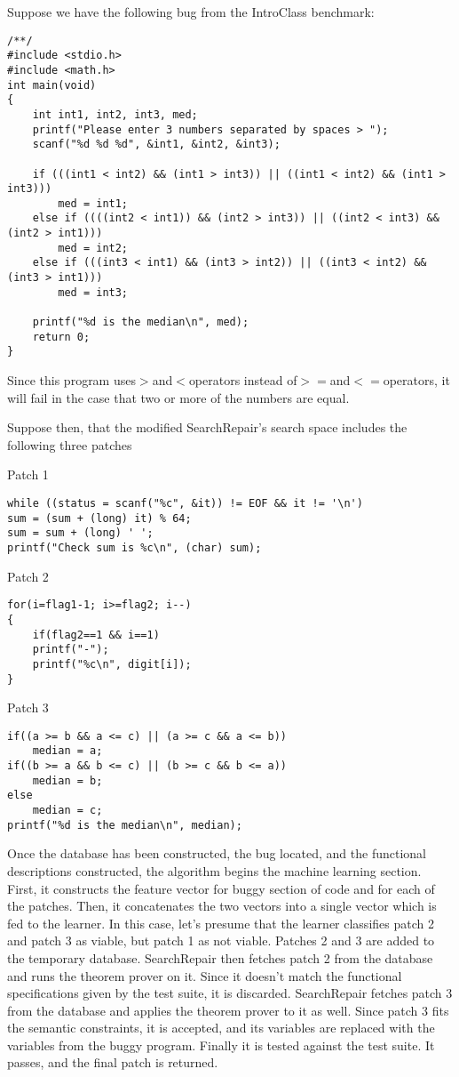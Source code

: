 \documentclass{paper}
\begin{document}
Suppose we have the following bug from the IntroClass benchmark: 

\begin{lstlisting}
/**/
#include <stdio.h>
#include <math.h>
int main(void)
{
	int int1, int2, int3, med; 
	printf("Please enter 3 numbers separated by spaces > ");
	scanf("%d %d %d", &int1, &int2, &int3);

	if (((int1 < int2) && (int1 > int3)) || ((int1 < int2) && (int1 > int3)))
	 	med = int1;
	else if ((((int2 < int1)) && (int2 > int3)) || ((int2 < int3) && (int2 > int1)))
        med = int2;
	else if (((int3 < int1) && (int3 > int2)) || ((int3 < int2) && (int3 > int1)))
	    med = int3;
    
    printf("%d is the median\n", med);
	return 0;
}                                             
\end{lstlisting}

Since this program uses$ > $and$ < $operators instead of$ >= $and$ <= $operators, it will fail in the case that two or more of the numbers are equal. 

Suppose then, that the modified SearchRepair's search space includes the following three patches

Patch 1
\begin{lstlisting}
while ((status = scanf("%c", &it)) != EOF && it != '\n') 
sum = (sum + (long) it) % 64;
sum = sum + (long) ' ';
printf("Check sum is %c\n", (char) sum);                                             
\end{lstlisting}

Patch 2
\begin{lstlisting}
for(i=flag1-1; i>=flag2; i--)
{ 
	if(flag2==1 && i==1)
	printf("-");
	printf("%c\n", digit[i]);
}
\end{lstlisting}

Patch 3
\begin{lstlisting}
if((a >= b && a <= c) || (a >= c && a <= b))
	median = a;
if((b >= a && b <= c) || (b >= c && b <= a))
	median = b;
else
	median = c;
printf("%d is the median\n", median);
\end{lstlisting}

Once the database has been constructed, the bug located, and the functional descriptions constructed, the algorithm begins the machine learning section.
 First, it constructs the feature vector for buggy section of code and for each of the patches. 
 Then, it concatenates the two vectors into a single vector which is fed to the learner. 
 In this case, let's presume that the learner classifies patch 2 and patch 3 as viable, but patch 1 as not viable.
  Patches 2 and 3 are added to the temporary database. 
  SearchRepair then fetches patch 2 from the database and runs the theorem prover on it.
   Since it doesn't match the functional specifications given by the test suite, it is discarded.
    SearchRepair fetches patch 3 from the database and applies the theorem prover to it as well.
     Since patch 3 fits the semantic constraints, it is accepted, and its variables are replaced with the variables from the buggy program.
      Finally it is tested against the test suite. 
      It passes, and the final patch is returned.
\end{document}
